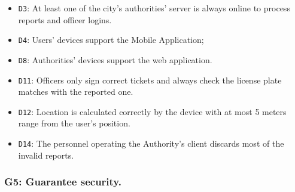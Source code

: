 \documentclass[12pt,a4paper]{article}
\begin{document}
	\begin{itemize}
			\item \texttt{D3}: At least one of the city's authorities' server is always online to process reports and officer logins.
			\item \texttt{D4}: Users' devices support the Mobile Application;
			\item \texttt{D8}: Authorities' devices support the web application.
			\item \texttt{D11}: Officers only sign correct tickets and always check the license plate matches with the reported one.
			\item \texttt{D12}: Location is calculated correctly by the device with at most 5 meters range from the user's position.
			\item \texttt{D14}: The personnel operating the Authority's client discards most of the invalid reports.
	\end{itemize}

\subsubsection{G5: Guarantee security.}
	
\end{document}

